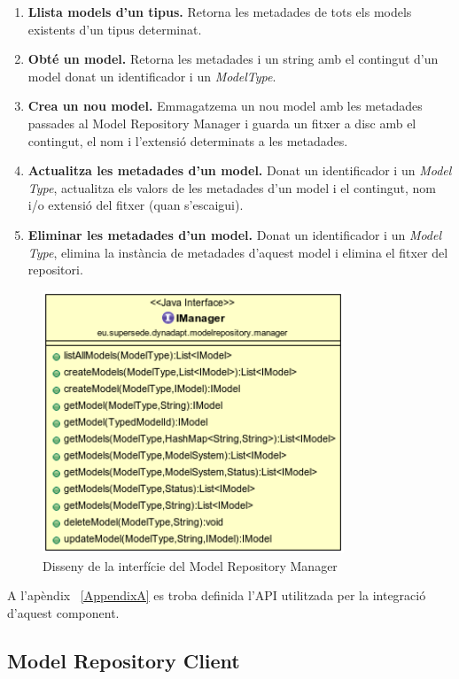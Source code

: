 \begin{enumerate}
\item \textbf{Llista models d'un tipus.} Retorna les metadades de tots els models existents d'un tipus determinat.
\item \textbf{Obté un model.} Retorna les metadades i un string amb el contingut d'un model donat un identificador i un \textit{ModelType}.
\item \textbf{Crea un nou model.} Emmagatzema un nou model amb les metadades passades al Model Repository Manager i guarda un fitxer a disc amb el contingut, el nom i l'extensió determinats a les metadades.
\item \textbf{Actualitza les metadades d'un model.} Donat un identificador i un \textit{Model Type}, actualitza els valors de les metadades d'un model i el contingut, nom i/o extensió del fitxer (quan s'escaigui). 
\item \textbf{Eliminar les metadades d'un model.} Donat un identificador i un \textit{Model Type}, elimina la instància de metadades d'aquest model i elimina el fitxer del repositori.
\end{enumerate}


\begin{figure}
\centering
\includegraphics[width=9cm]{Figures/Figure27}
\decoRule
\caption{Disseny de la interfície del Model Repository Manager}
\label{fig:Figura27}
\end{figure}

A l'apèndix ~\ref{AppendixA} es troba definida l'API utilitzada per la integració d'aquest component.

\subsection{Model Repository Client}

